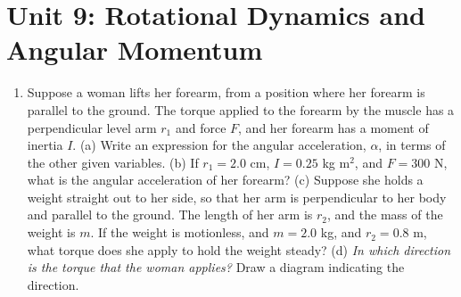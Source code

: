 \documentclass[10pt]{article}
\begin{document}
\section{Unit 9: Rotational Dynamics and Angular Momentum}
\begin{enumerate}
\item Suppose a woman lifts her forearm, from a position where her forearm is parallel to the ground.  The torque applied to the forearm by the muscle has a perpendicular level arm $r_1$ and force $F$, and her forearm has a moment of inertia $I$.  (a) Write an expression for the angular acceleration, $\alpha$, in terms of the other given variables.  (b) If $r_1 = 2.0$ cm, $I = 0.25$ kg m$^2$, and $F = 300$ N, what is the angular acceleration of her forearm?  (c) Suppose she holds a weight straight out to her side, so that her arm is perpendicular to her body and parallel to the ground.  The length of her arm is $r_2$, and the mass of the weight is $m$.  If the weight is motionless, and $m = 2.0$ kg, and $r_2 = 0.8$ m, what torque does she apply to hold the weight steady?  (d) \textit{In which direction is the torque that the woman applies?}  Draw a diagram indicating the direction.
\end{enumerate}
\end{document}
